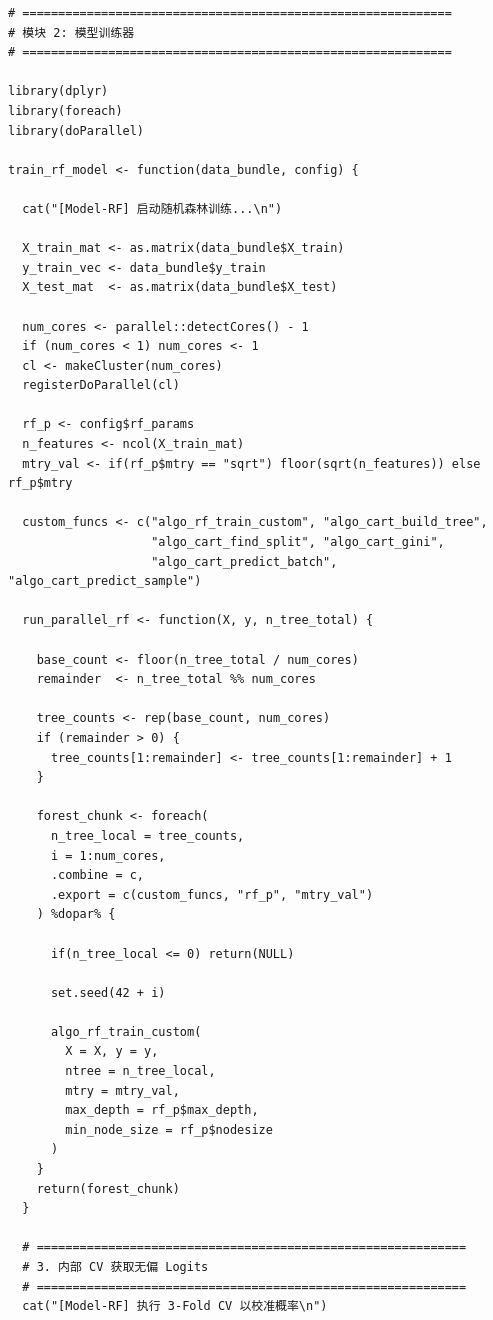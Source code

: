 \documentclass[11pt, a4paper]{article}
\begin{document}
\begin{verbatim}
# ============================================================
# 模块 2: 模型训练器
# ============================================================

library(dplyr)
library(foreach)
library(doParallel)

train_rf_model <- function(data_bundle, config) {
  
  cat("[Model-RF] 启动随机森林训练...\n")
  
  X_train_mat <- as.matrix(data_bundle$X_train)
  y_train_vec <- data_bundle$y_train
  X_test_mat  <- as.matrix(data_bundle$X_test)
  
  num_cores <- parallel::detectCores() - 1
  if (num_cores < 1) num_cores <- 1
  cl <- makeCluster(num_cores)
  registerDoParallel(cl)
  
  rf_p <- config$rf_params
  n_features <- ncol(X_train_mat)
  mtry_val <- if(rf_p$mtry == "sqrt") floor(sqrt(n_features)) else rf_p$mtry
  
  custom_funcs <- c("algo_rf_train_custom", "algo_cart_build_tree", 
                    "algo_cart_find_split", "algo_cart_gini", 
                    "algo_cart_predict_batch", "algo_cart_predict_sample")
  
  run_parallel_rf <- function(X, y, n_tree_total) {
    
    base_count <- floor(n_tree_total / num_cores)
    remainder  <- n_tree_total %% num_cores
    
    tree_counts <- rep(base_count, num_cores)
    if (remainder > 0) {
      tree_counts[1:remainder] <- tree_counts[1:remainder] + 1
    }
    
    forest_chunk <- foreach(
      n_tree_local = tree_counts, 
      i = 1:num_cores,
      .combine = c, 
      .export = c(custom_funcs, "rf_p", "mtry_val") 
    ) %dopar% {
      
      if(n_tree_local <= 0) return(NULL)
      
      set.seed(42 + i)
      
      algo_rf_train_custom(
        X = X, y = y,
        ntree = n_tree_local,
        mtry = mtry_val,
        max_depth = rf_p$max_depth,
        min_node_size = rf_p$nodesize
      )
    }
    return(forest_chunk)
  }
  
  # ============================================================
  # 3. 内部 CV 获取无偏 Logits
  # ============================================================
  cat("[Model-RF] 执行 3-Fold CV 以校准概率\n")
  

\end{verbatim}
\end{document}
